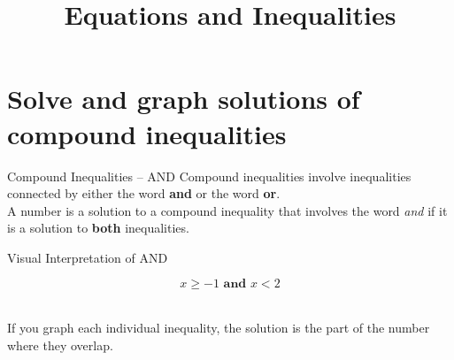\documentclass[t]{beamer}
\title{Equations and Inequalities}
\author{}
\date{}
\begin{document}
\begin{frame} 
\maketitle
\end{frame}

\section{Solve and graph solutions of compound inequalities}

\begin{frame}{Compound Inequalities -- AND}
	Compound inequalities involve inequalities connected by either the word {\color{blue}\textbf{and}} or the word {\color{red}\textbf{or}}.	\newline\\	\pause
	A number is a solution to a compound inequality that involves the word \emph{and} if it is a solution to \textbf{both} inequalities.
\end{frame}

\begin{frame}{Visual Interpretation of AND}
	\begin{center}
		\[x \geq -1 \textbf{ and } x < 2\]
			\newline\\
		If you graph each individual inequality, the solution is the part of the number where they overlap.
	\end{center}
\end{frame}
\end{document}

